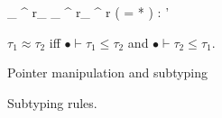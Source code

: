 \begin{figure}[t]
{  }{
     \Theta   \mid   {}   \mid   \Gamma  \ottsym{[}    \ottsym{:}   \tau_{{}}  \TREF^{ r_{{}} }   \ottsym{]}  \ottsym{[}    \ottsym{:}   \ottsym{(}   \tau_{{}}  \TREF^{ r_{{}} }   \ottsym{)}  \TREF^{ r }   \ottsym{]}   \vdash    \ALIAS(   = *   ) \SEQ  {}   :  \tau   \produces   \Gamma' 
  }
    \vspace*{2ex}
  \vspace*{2ex}
  \begin{center}
    $\tau_{{\mathrm{1}}}  \approx  \tau_{{\mathrm{2}}}$ iff $ \bullet   \vdash  \tau_{{\mathrm{1}}}  \leq  \tau_{{\mathrm{2}}}$ and $ \bullet   \vdash  \tau_{{\mathrm{2}}}  \leq  \tau_{{\mathrm{1}}}$.
  \end{center}
  \caption{Pointer manipulation and subtyping}
  \label{fig:pointer-typing}
\end{figure}

\begin{figure}[t]
  \begin{multicols}{2}
  \scriptsize
    \vspace*{2ex}
    \vspace*{2ex}
  \end{multicols}
  \caption{Subtyping rules.}
  \label{fig:subtyping}
\end{figure}

